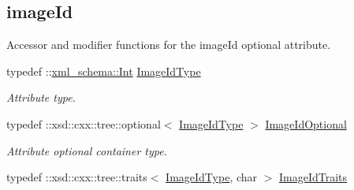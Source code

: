 \subsection*{imageId}
\label{_amgrp3f634a414d187368bc41638f11235cdc}
Accessor and modifier functions for the imageId optional attribute. \begin{DoxyCompactItemize}
\item 
\hypertarget{classopenstack_1_1xml_1_1Server_ae297eb5e35deb4ecd622a0a95dfa9626}{
typedef ::\hyperlink{namespacexml__schema_a12d975a13061c938969b2b5143e97645}{xml\_\-schema::Int} \hyperlink{classopenstack_1_1xml_1_1Server_ae297eb5e35deb4ecd622a0a95dfa9626}{ImageIdType}}
\label{classopenstack_1_1xml_1_1Server_ae297eb5e35deb4ecd622a0a95dfa9626}

\begin{DoxyCompactList}\small\item\em Attribute type. \item\end{DoxyCompactList}\item 
\hypertarget{classopenstack_1_1xml_1_1Server_aa8051cfd378e9bbed91d801bde80df3f}{
typedef ::xsd::cxx::tree::optional$<$ \hyperlink{classopenstack_1_1xml_1_1Server_ae297eb5e35deb4ecd622a0a95dfa9626}{ImageIdType} $>$ \hyperlink{classopenstack_1_1xml_1_1Server_aa8051cfd378e9bbed91d801bde80df3f}{ImageIdOptional}}
\label{classopenstack_1_1xml_1_1Server_aa8051cfd378e9bbed91d801bde80df3f}

\begin{DoxyCompactList}\small\item\em Attribute optional container type. \item\end{DoxyCompactList}\item 
\hypertarget{classopenstack_1_1xml_1_1Server_a6605d3f2b9912f8f73f67f34ec1cc47a}{
typedef ::xsd::cxx::tree::traits$<$ \hyperlink{classopenstack_1_1xml_1_1Server_ae297eb5e35deb4ecd622a0a95dfa9626}{ImageIdType}, char $>$ \hyperlink{classopenstack_1_1xml_1_1Server_a6605d3f2b9912f8f73f67f34ec1cc47a}{ImageIdTraits}}
\label{classopenstack_1_1xml_1_1Server_a6605d3f2b9912f8f73f67f34ec1cc47a}


\end{DoxyCompactItemize}
